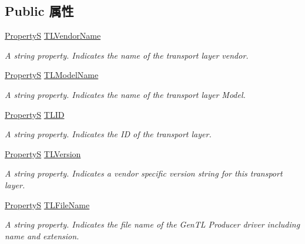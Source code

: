 \subsection*{Public 属性}
\begin{DoxyCompactItemize}
\item 
\hyperlink{classmv_i_m_p_a_c_t_1_1acquire_1_1_property_s}{Property\+S} \hyperlink{classmv_i_m_p_a_c_t_1_1acquire_1_1_gen_i_cam_1_1_system_module_a4b14d0aa202e4a6f813f8fc8e6cc11b6}{T\+L\+Vendor\+Name}
\begin{DoxyCompactList}\small\item\em A string property. Indicates the name of the transport layer vendor. \end{DoxyCompactList}\item 
\hyperlink{classmv_i_m_p_a_c_t_1_1acquire_1_1_property_s}{Property\+S} \hyperlink{classmv_i_m_p_a_c_t_1_1acquire_1_1_gen_i_cam_1_1_system_module_a3dd9e091672c62757fbe1de1cee0f30a}{T\+L\+Model\+Name}
\begin{DoxyCompactList}\small\item\em A string property. Indicates the name of the transport layer Model. \end{DoxyCompactList}\item 
\hyperlink{classmv_i_m_p_a_c_t_1_1acquire_1_1_property_s}{Property\+S} \hyperlink{classmv_i_m_p_a_c_t_1_1acquire_1_1_gen_i_cam_1_1_system_module_a4ed6c131c7c3bbd4ceb979fcd04a4f4b}{T\+L\+I\+D}
\begin{DoxyCompactList}\small\item\em A string property. Indicates the I\+D of the transport layer. \end{DoxyCompactList}\item 
\hyperlink{classmv_i_m_p_a_c_t_1_1acquire_1_1_property_s}{Property\+S} \hyperlink{classmv_i_m_p_a_c_t_1_1acquire_1_1_gen_i_cam_1_1_system_module_a876fa426180d3e60e2d600dd1e5ab6d2}{T\+L\+Version}
\begin{DoxyCompactList}\small\item\em A string property. Indicates a vendor specific version string for this transport layer. \end{DoxyCompactList}\item 
\hyperlink{classmv_i_m_p_a_c_t_1_1acquire_1_1_property_s}{Property\+S} \hyperlink{classmv_i_m_p_a_c_t_1_1acquire_1_1_gen_i_cam_1_1_system_module_a4f77060028e0d27ae600a3a197adb65d}{T\+L\+File\+Name}
\begin{DoxyCompactList}\small\item\em A string property. Indicates the file name of the Gen\+T\+L Producer driver including name and extension. \end{DoxyCompactList}\item 

\end{DoxyCompactItemize}
